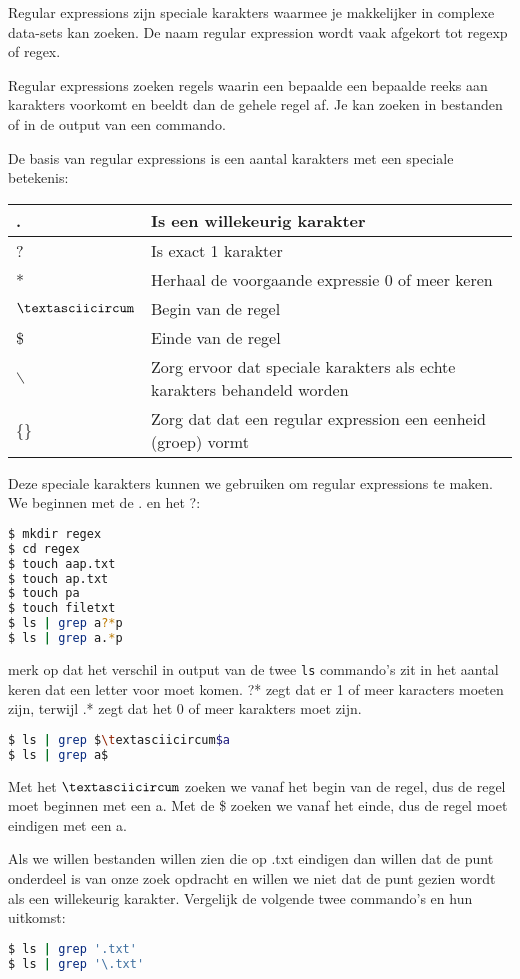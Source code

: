 Regular expressions zijn speciale karakters waarmee je makkelijker in complexe data-sets kan zoeken. De naam regular expression wordt vaak afgekort tot regexp of regex.

Regular expressions zoeken regels waarin een bepaalde een bepaalde reeks aan karakters voorkomt en beeldt dan de gehele regel af. Je kan zoeken in bestanden of in de output van een commando.

De basis van regular expressions is een aantal karakters met een speciale betekenis:

\begin{tabular}{| l | l |}
\hline
. & Is een willekeurig karakter \\
\hline
? & Is exact 1 karakter \\
\hline
* & Herhaal de voorgaande expressie 0 of meer keren \\
\hline
$\textasciicircum$ & Begin van de regel \\
\hline
\$ & Einde van de regel \\
\hline
$\backslash$ & Zorg ervoor dat speciale karakters als echte karakters behandeld worden \\
\hline
\{\} & Zorg dat dat een regular expression een eenheid (groep) vormt \\
\hline
\end{tabular}

Deze speciale karakters kunnen we gebruiken om regular expressions te maken. We beginnen met de . en het ?:
\begin{lstlisting}[language=bash]
$ mkdir regex
$ cd regex
$ touch aap.txt
$ touch ap.txt
$ touch pa
$ touch filetxt
$ ls | grep a?*p
$ ls | grep a.*p
\end{lstlisting}
merk op dat het verschil in output van de twee \texttt{ls} commando's zit in het aantal keren dat een letter voor moet komen. ?* zegt dat er 1 of meer karacters moeten zijn, terwijl .* zegt dat het 0 of meer karakters moet zijn.

\begin{lstlisting}[language=bash]
$ ls | grep $\textasciicircum$a
$ ls | grep a$
\end{lstlisting}
Met het $\textasciicircum$ zoeken we vanaf het begin van de regel, dus de regel moet beginnen met een a. Met de \$ zoeken we vanaf het einde, dus de regel moet eindigen met een a.

Als we willen bestanden willen zien die op .txt eindigen dan willen dat de punt onderdeel is van onze zoek opdracht en willen we niet dat de punt gezien wordt als een willekeurig karakter. Vergelijk de volgende twee commando's en hun uitkomst:
\begin{lstlisting}[language=bash]
$ ls | grep '.txt'
$ ls | grep '\.txt'
\end{lstlisting}

